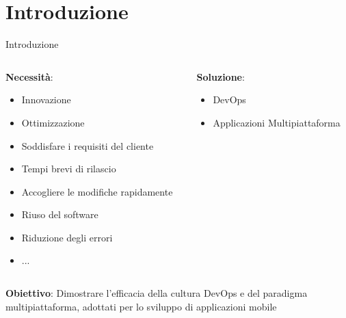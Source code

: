 
\section{Introduzione}

\begin{frame}{Introduzione}
    \begin{columns}[onlytextwidth,t]
        \begin{column}{0.5\textwidth}
        
            \textbf{Necessità}:
            \begin{itemize}
                \item Innovazione
                \item Ottimizzazione
                \item Soddisfare i requisiti del cliente
                \item Tempi brevi di rilascio
                \item Accogliere le modifiche rapidamente
                \item Riuso del software
                \item Riduzione degli errori
                \item ...
            \end{itemize}
            
        \end{column}
        \begin{column}{0.5\textwidth}
        
            \textbf{Soluzione}:
            \begin{itemize}
                \item DevOps
                \item Applicazioni Multipiattaforma
            \end{itemize}
            
        \end{column}
    \end{columns}    
    
    \vspace{5mm}
    
    \textbf{Obiettivo}: Dimostrare l'efficacia della cultura DevOps e del paradigma multipiattaforma, adottati per lo sviluppo di applicazioni mobile
\end{frame}

